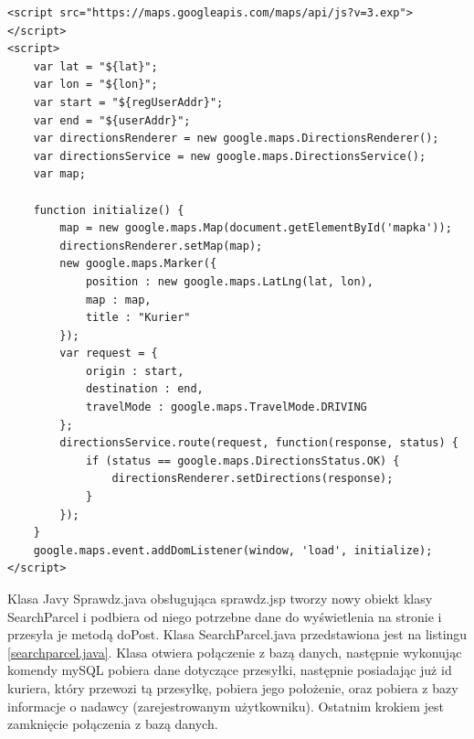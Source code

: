 \documentclass[eng,printmode,oneside]{mgr}
\begin{document}
\begin{lstlisting}[caption=Kody JavaScript'owy pobierający mapę z
serwera Google,label=mapsJS] 
<script src="https://maps.googleapis.com/maps/api/js?v=3.exp"></script> 
<script>
	var lat = "${lat}";
	var lon = "${lon}";
	var start = "${regUserAddr}";
	var end = "${userAddr}";
	var directionsRenderer = new google.maps.DirectionsRenderer();
	var directionsService = new google.maps.DirectionsService();
	var map;

	function initialize() {
		map = new google.maps.Map(document.getElementById('mapka'));
		directionsRenderer.setMap(map);
		new google.maps.Marker({
			position : new google.maps.LatLng(lat, lon),
			map : map,
			title : "Kurier"
		});
		var request = {
			origin : start,
			destination : end,
			travelMode : google.maps.TravelMode.DRIVING
		};
		directionsService.route(request, function(response, status) {
			if (status == google.maps.DirectionsStatus.OK) {
				directionsRenderer.setDirections(response);
			}
		});
	}
	google.maps.event.addDomListener(window, 'load', initialize);
</script>
\end{lstlisting}

Klasa Javy Sprawdz.java obsługująca sprawdz.jsp tworzy nowy obiekt klasy
SearchParcel i podbiera od niego potrzebne dane do wyświetlenia na stronie i
przesyła je metodą doPost. Klasa SearchParcel.java przedstawiona jest na
listingu \ref{searchparcel.java}. Klasa otwiera połączenie z bazą danych,
następnie wykonując komendy mySQL pobiera dane dotyczące przesyłki, następnie
posiadając już id kuriera, który przewozi tą przesyłkę, pobiera jego położenie,
oraz pobiera z bazy informacje o nadawcy (zarejestrowanym użytkowniku). Ostatnim
krokiem jest zamknięcie połączenia z bazą danych.
\end{document}

